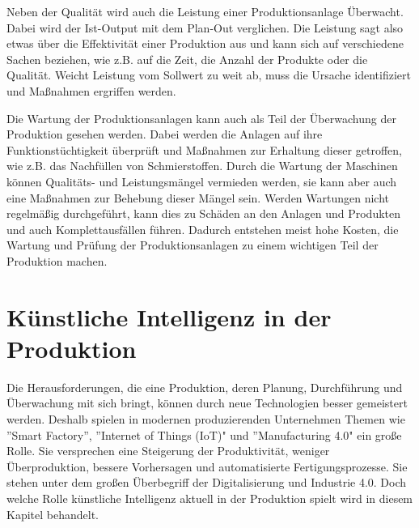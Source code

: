 \documentclass[a4paper,12pt, german]{report}
\begin{document}
Neben der Qualität wird auch die Leistung einer Produktionsanlage Überwacht. Dabei wird der Ist-Output mit dem Plan-Out verglichen. Die Leistung sagt also etwas über die Effektivität einer Produktion aus und kann sich auf verschiedene Sachen beziehen, wie z.B. auf die Zeit, die Anzahl der Produkte oder die Qualität. Weicht Leistung vom Sollwert zu weit ab, muss die Ursache identifiziert und Maßnahmen ergriffen werden. \cite{07}

Die Wartung der Produktionsanlagen kann auch als Teil der Überwachung der Produktion gesehen werden. Dabei werden die Anlagen auf ihre Funktionstüchtigkeit überprüft und Maßnahmen zur Erhaltung dieser getroffen, wie z.B. das Nachfüllen von Schmierstoffen. Durch die Wartung der Maschinen können Qualitäts- und Leistungsmängel vermieden werden, sie kann aber auch eine Maßnahmen zur Behebung dieser Mängel sein. Werden Wartungen nicht regelmäßig durchgeführt, kann dies zu Schäden an den Anlagen und Produkten und auch Komplettausfällen führen. Dadurch entstehen meist hohe Kosten, die Wartung und Prüfung der Produktionsanlagen zu einem wichtigen Teil der Produktion machen. \cite{07}






\chapter{Künstliche Intelligenz in der Produktion}
Die Herausforderungen, die eine Produktion, deren Planung, Durchführung und Überwachung mit sich bringt, können durch neue Technologien besser gemeistert werden. Deshalb spielen in modernen produzierenden Unternehmen Themen wie ''Smart Factory'', ''Internet of Things (IoT)" und ''Manufacturing 4.0" ein große Rolle. Sie versprechen eine Steigerung der Produktivität, weniger Überproduktion, bessere Vorhersagen und automatisierte Fertigungsprozesse. Sie stehen unter dem großen Überbegriff der Digitalisierung und Industrie 4.0. Doch welche Rolle künstliche Intelligenz aktuell in der Produktion spielt wird in diesem Kapitel behandelt.
\end{document}
